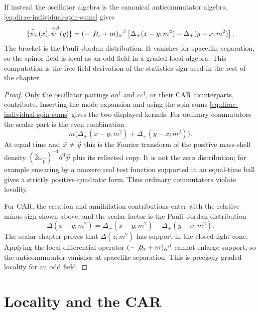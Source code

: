 \begin{proposition}
If instead the oscillator algebra is the canonical anticommutator algebra,
\eqref{eq:dirac-individual-spin-sums} gives
\[
  \{\widehat\psi_\alpha(x),\widehat{\bar\psi}^{\beta}(y)\}
  =
  (-\not\partial_x+m)_\alpha{}^\beta
  \left[
    \Delta_+(x-y;m^2)-\Delta_+(y-x;m^2)
  \right].
\]
The bracket is the Pauli--Jordan distribution. It vanishes for spacelike
separation, so the spinor field is local as an odd field in a graded local
algebra. This computation is the free-field derivation of the statistics sign
used in the rest of the chapter.
\end{proposition}

\begin{proof}
Only the oscillator pairings \(aa^\dagger\) and \(cc^\dagger\), or their CAR
counterparts, contribute.  Inserting the mode expansion and using the spin
sums \eqref{eq:dirac-individual-spin-sums} gives the two displayed kernels.
For ordinary commutators the scalar part is the even combination
\[
  m\bigl(\Delta_+(x-y;m^2)+\Delta_+(y-x;m^2)\bigr).
\]
At equal time and \(\vec x\ne\vec y\) this is the Fourier transform of the
positive mass-shell density
\((2\omega_{\vec p})^{-1}d^3\vec p\) plus its reflected copy.  It is not the
zero distribution; for example smearing by a nonzero real test function
supported in an equal-time ball gives a strictly positive quadratic form.
Thus ordinary commutators violate locality.

For CAR, the creation and annihilation contributions enter with the relative
minus sign shown above, and the scalar factor is the Pauli--Jordan
distribution
\[
  \Delta(x-y;m^2)=\Delta_+(x-y;m^2)-\Delta_+(y-x;m^2).
\]
The scalar chapter proves that \(\Delta(z;m^2)\) has support in the closed
light cone. Applying the local differential operator
\((-\not\partial_x+m)_\alpha{}^\beta\) cannot enlarge support, so the
anticommutator vanishes at spacelike separation. This is precisely graded
locality for an odd field.
\end{proof}

\section{Locality and the CAR}

